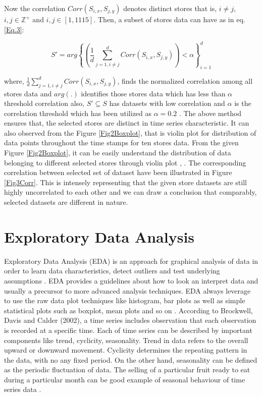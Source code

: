 Now the correlation $Corr(S_{i,x}, S_{j,y})$ denotes distinct stores that is, $i\neq j$,  $ i, j\in \mathbb{Z}^{+}$ and $i, j \in [1, 1115]$. Then, a subset of stores data can have as in eq. \ref{Eq.3}:

\begin{equation}
\label{Eq.3}
    S'= arg\left \{ \left ( \frac{1}{d} \sum_{j=1, i\neq j}^{d} Corr(S_{i,x}, S_{j,y})\right )<\alpha\right\}_{i=1}^{d}
\end{equation}

where, $\frac{1}{d} \sum_{j=1, i\neq j}^{d} Corr(S_{i,x}, S_{j,y})$, finds the normalized correlation among all stores data and $arg(.)$ identifies those stores data which has less than $\alpha$ threshold correlation also, $S' \subseteq S$ has datasets with low correlation and $\alpha$ is the correlation threshold which has been utilized as $\alpha = 0.2$ . The above method ensures that, the selected stores are distinct in time series characteristic. It can also observed from the Figure \ref{Fig2Boxplot}, that is violin plot for distribution of data points throughout the time stamps for ten stores data. From the given Figure \ref{Fig2Boxplot}, it can be easily understand the distribution of data belonging to different selected stores through violin plot \cite{tanious2022violin}, \cite{molina2022should}. The corresponding correlation between selected set of dataset have been illustrated in Figure \ref{Fig3Corr}. This is intensely representing that the given store datasets are still highly uncorrelated to each other and we can draw a conclusion that comparably, selected datasets are different in nature.

\section{Exploratory Data Analysis}
Exploratory Data Analysis (EDA) is an approach for graphical analysis of data in order to learn data characteristics, detect outliers and test underlying assumptions \cite{azis2020time} . EDA provides a guidelines about how to look an interpret data and usually a precursor to more advanced analysis techniques. EDA always leverage to use the raw data plot techniques like histogram, bar plots as well as simple statistical plots such as boxplot, mean plots and so on \cite{de2007exploratory}. According to Brockwell, Davis and Calder (2002), a time series includes observation that each observation is recorded at a specific time. Each of time series can be described by important components like trend, cyclicity, seasonality. Trend in data refers to the overall upward or downward movement. Cyclicity determines the repeating pattern in the data, with no any fixed period. On the other hand, seasonality can be defined as the periodic fluctuation of data. The selling of a particular fruit ready to eat during a particular month can be good example of seasonal behaviour of time series data \cite{ensafi2022time} . 

